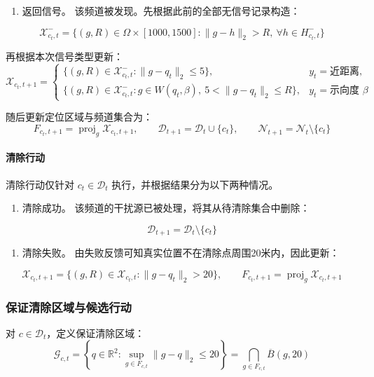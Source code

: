 \begin{enumerate}
\def\labelenumi{\arabic{enumi}.}
\setcounter{enumi}{1}
\tightlist
\item
  返回信号。 该频道被发现。先根据此前的全部无信号记录构造：
\end{enumerate}
\[
\mathcal X^-_{c_t,t}
   =
   \{(g,R)\in\Omega\times[1000,1500]:
   \|g-h\|_2>R,\ \forall h\in H^-_{c_t,t}\}
\]

再根据本次信号类型更新：
\[
\mathcal X_{c_t,t+1}=
   \begin{cases}
   \{(g,R)\in\mathcal X^-_{c_t,t}:\|g-q_t\|_2\le5\},
   &y_t=\text{近距离},\\[1mm]
   \{(g,R)\in\mathcal X^-_{c_t,t}:g\in W(q_t,\beta),\ 5<\|g-q_t\|_2\le R\},
   &y_t=\text{示向度 }\beta
   \end{cases}
   \tag{23c}
\]

随后更新定位区域与频道集合为：
\[
F_{c_t,t+1}=\operatorname{proj}_g\mathcal X_{c_t,t+1},
   \qquad
   \mathcal D_{t+1}=\mathcal D_t\cup\{c_t\},
   \qquad
   \mathcal N_{t+1}=\mathcal N_t\setminus\{c_t\}
\]

\paragraph{清除行动}

清除行动仅针对 \(c_t\in\mathcal D_t\) 执行，并根据结果分为以下两种情况。

\begin{enumerate}
\def\labelenumi{\arabic{enumi}.}
\tightlist
\item
  清除成功。 该频道的干扰源已被处理，将其从待清除集合中删除：
\end{enumerate}
\[
\mathcal D_{t+1}=\mathcal D_t\setminus\{c_t\}
\]

\begin{enumerate}
\def\labelenumi{\arabic{enumi}.}
\setcounter{enumi}{1}
\tightlist
\item
  清除失败。 由失败反馈可知真实位置不在清除点周围20米内，因此更新：
\end{enumerate}
\[
\mathcal X_{c_t,t+1}
   =
   \{(g,R)\in\mathcal X_{c_t,t}:\|g-q_t\|_2>20\},
   \qquad
   F_{c_t,t+1}=\operatorname{proj}_g\mathcal X_{c_t,t+1}
   \tag{23d}
\]

\subsubsection{保证清除区域与候选行动}

对 \(c\in\mathcal D_t\)，定义保证清除区域：
\[
\mathcal G_{c,t}
=
\left\{q\in\mathbb R^2:
\sup_{g\in F_{c,t}}\|g-q\|_2\le20
\right\}
=
\bigcap_{g\in F_{c,t}}\overline B(g,20)
\tag{24}
\]

